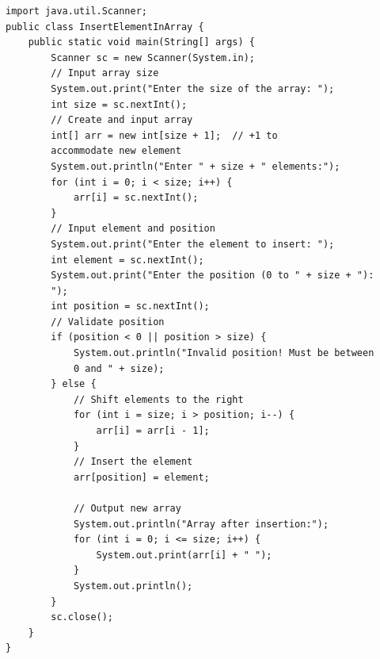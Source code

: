 \begin{verbatim}
import java.util.Scanner;
public class InsertElementInArray {
    public static void main(String[] args) {
        Scanner sc = new Scanner(System.in);
        // Input array size
        System.out.print("Enter the size of the array: ");
        int size = sc.nextInt();
        // Create and input array
        int[] arr = new int[size + 1];  // +1 to 
        accommodate new element
        System.out.println("Enter " + size + " elements:");
        for (int i = 0; i < size; i++) {
            arr[i] = sc.nextInt();
        }
        // Input element and position
        System.out.print("Enter the element to insert: ");
        int element = sc.nextInt();
        System.out.print("Enter the position (0 to " + size + "):
        ");
        int position = sc.nextInt();
        // Validate position
        if (position < 0 || position > size) {
            System.out.println("Invalid position! Must be between 
            0 and " + size);
        } else {
            // Shift elements to the right
            for (int i = size; i > position; i--) {
                arr[i] = arr[i - 1];
            }
            // Insert the element
            arr[position] = element;

            // Output new array
            System.out.println("Array after insertion:");
            for (int i = 0; i <= size; i++) {
                System.out.print(arr[i] + " ");
            }
            System.out.println();
        }
        sc.close();
    }
}

\end{verbatim}